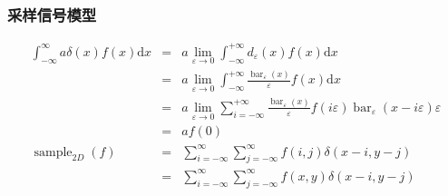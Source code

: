 \documentclass{beamer}
\newcommand{\mathd}{\mathrm{d}}
\newcommand{\nospace}{}
\newcommand{\tmop}[1]{\ensuremath{\operatorname{#1}}}
\begin{document}
{{\begin{frame}
  {\hspace{5em}}
\end{frame}}{\begin{frame}
  \frametitle{采样信号模型}
  \begin{eqnarray*}
    \int_{- \infty}^{\infty} a \delta (x) f (x) \mathd x & = & a \nospace
    \lim_{\varepsilon \rightarrow 0} \int_{- \infty}^{+ \infty}
    d_{\varepsilon} (x) f (x) \mathd x\\
    & = & a \nospace \lim_{\varepsilon \rightarrow 0} \int_{- \infty}^{+
    \infty} \frac{\tmop{bar}_{\varepsilon} (x)}{\varepsilon} f (x) \mathd x\\
    & = & a \nospace \lim_{\varepsilon \rightarrow 0} \sum_{i = - \infty}^{+
    \infty} \frac{\tmop{bar}_{\varepsilon} (x)}{\varepsilon} f (i \varepsilon)
    \tmop{bar}_{\varepsilon} (x - i \varepsilon) \varepsilon\\
    & = & a \nospace f (0)\\
    \tmop{sample}_{2 D} (f) & = & \sum_{i = - \infty}^{\infty} \sum_{j = -
    \infty}^{\infty} f (i, j) \delta (x - i, y - j)\\
    & = & \sum_{i = - \infty}^{\infty} \sum_{j = - \infty}^{\infty} f (x, y)
    \delta (x - i, y - j)
  \end{eqnarray*}
\end{frame}}{\begin{frame}
  \
  

\end{frame}}}
\end{document}
